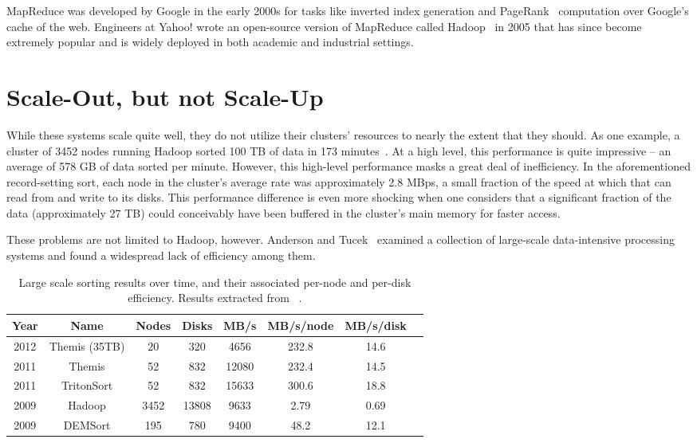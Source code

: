MapReduce was developed by Google in the early 2000s for tasks like inverted
index generation and PageRank~\cite{pagerank} computation over Google's cache
of the web. Engineers at Yahoo! wrote an open-source version of MapReduce
called Hadoop~\cite{hadoop} in 2005 that has since become extremely popular and
is widely deployed in both academic and industrial settings.

\section{Scale-Out, but not Scale-Up}

While these systems scale quite well, they do not utilize their clusters'
resources to nearly the extent that they should. As one example, a cluster of
3452 nodes running Hadoop sorted 100 TB of data in 173
minutes~\cite{hadoop-sort-2009}. At a high level, this performance is quite
impressive -- an average of 578 GB of data sorted per minute. However, this
high-level performance masks a great deal of inefficiency. In the
aforementioned record-setting sort, each node in the cluster's average rate was
approximately 2.8 MBps, a small fraction of the speed at which that can read
from and write to its disks. This performance difference is even more shocking
when one considers that a significant fraction of the data (approximately 27
TB) could conceivably have been buffered in the cluster's main memory for
faster access.

These problems are not limited to Hadoop, however. Anderson and
Tucek~\cite{efficiency-matters} examined a collection of large-scale
data-intensive processing systems and found a widespread lack of efficiency
among them.

\begin{table}
\caption{\label{table:system-efficiency} Large scale sorting results over time,
  and their associated per-node and per-disk efficiency. Results extracted from
  ~\cite{efficiency-matters, hadoop-sort-2009, themis, tritonsort}.}
\centering
\begin{tabular}{|c|c|c|c|c|c|c|c|}
\hline
\textbf{Year} & \textbf{Name} & \textbf{Nodes} & \textbf{Disks} & \textbf{MB/s} & \textbf{MB/s/node} & \textbf{MB/s/disk}\\
\hline
2012 & Themis (35TB) & 20 & 320 & 4656 & 232.8 & 14.6 \\
2011 & Themis & 52 & 832 & 12080 & 232.4 & 14.5 \\
2011 & TritonSort & 52 & 832  & 15633 & 300.6 & 18.8 \\
2009 & Hadoop & 3452 & 13808 & 9633 & 2.79 & 0.69 \\
2009 & DEMSort & 195 & 780 & 9400 & 48.2 & 12.1\\
\hline
\end{tabular}
\end{table}

